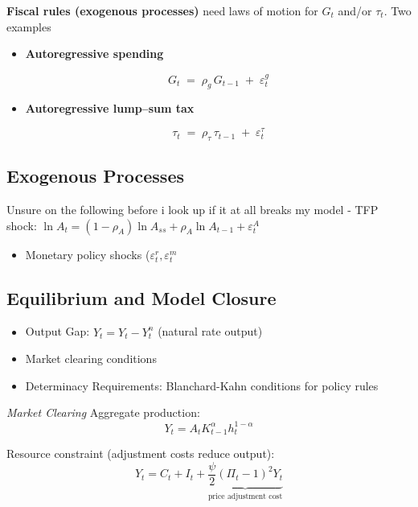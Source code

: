\documentclass[11pt,preprint]{elsarticle}
\numberwithin{equation}{section}
\numberwithin{figure}{section}
\numberwithin{table}{section}
\def\tightlist{} %
\begin{document}
\textbf{Fiscal rules (exogenous processes)} need laws of motion for
\(G_t\) and/or \(\tau_t\). Two examples

\begin{itemize}
\item
  \textbf{Autoregressive spending}

  \[
    G_t \;=\;\rho_g\,G_{t-1} \;+\; \varepsilon^g_t
    \tag{Exog.\ spending}
  \]
\item
  \textbf{Autoregressive lump--sum tax}

  \[
    \tau_t \;=\;\rho_\tau\,\tau_{t-1} \;+\; \varepsilon^\tau_t
    \tag{Exog.\ tax}
  \]
\end{itemize}

\subsection{Exogenous Processes}\label{exogenous-processes}

Unsure on the following before i look up if it at all breaks my model -
TFP shock:
\(\ln A_t = (1-\rho_A)\ln A_{ss} + \rho_A \ln A_{t-1} + \varepsilon_t^A\)

\begin{itemize}
\tightlist
\item
  Monetary policy shocks (\(\varepsilon_t^r, \varepsilon_t^m\)
\end{itemize}

\subsection{Equilibrium and Model
Closure}\label{equilibrium-and-model-closure}

\begin{itemize}
\item
  Output Gap: \(\hat{Y}_t = Y_t - Y_t^n\) (natural rate output)
\item
  Market clearing conditions
\item
  Determinacy Requirements: Blanchard-Kahn conditions for policy rules
\end{itemize}

\emph{Market Clearing} Aggregate production: \begin{equation}
Y_t = A_t K_{t-1}^{\alpha} h_t^{1-\alpha}
\label{aggregate_production}
\end{equation}

Resource constraint (adjustment costs reduce output): \begin{equation}
Y_t = C_t + I_t + \underbrace{\frac{\psi}{2} (\Pi_t - 1)^2 Y_t}_{\text{price adjustment cost}}
\label{resource_constraint}
\end{equation}
\end{document}
